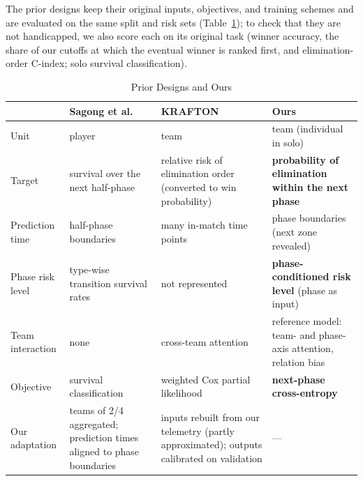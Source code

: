\documentclass[conference]{IEEEtran}
\begin{document}
The prior designs keep their original inputs, objectives, and training schemes and are evaluated on the same split and risk sets (Table~\ref{tab:compare}); to check that they are not handicapped, we also score each on its original task (winner accuracy, the share of our cutoffs at which the eventual winner is ranked first, and elimination-order C-index; solo survival classification).

\begin{table}[t]
\centering
\caption{Prior Designs and Ours}
\label{tab:compare}
\footnotesize
\begin{tabular}{p{2.3cm}p{4.3cm}p{4.6cm}p{4.6cm}}
\hline
 & Sagong et al.~\cite{Sagong25a} & KRAFTON~\cite{KRAFTON} & Ours \\
\hline
Unit & player & team & team (individual in solo) \\
Target & survival over the next half-phase & relative risk of elimination order (converted to win probability) & \textbf{probability of elimination within the next phase} \\
Prediction time & half-phase boundaries & many in-match time points & phase boundaries (next zone revealed) \\
Phase risk level & type-wise transition survival rates & not represented & \textbf{phase-conditioned risk level} (phase as input) \\
Team interaction & none & cross-team attention & reference model: team- and phase-axis attention, relation bias \\
Objective & survival classification & weighted Cox partial likelihood & \textbf{next-phase cross-entropy} \\
\hline
Our adaptation & teams of 2/4 aggregated; prediction times aligned to phase boundaries & inputs rebuilt from our telemetry (partly approximated); outputs calibrated on validation & --- \\
\hline
\end{tabular}
\end{table}
\end{document}
